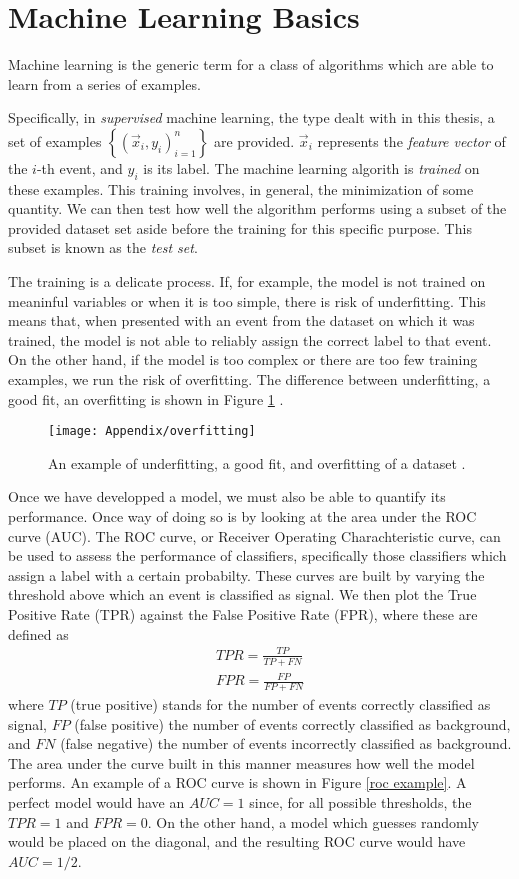 \documentclass[10pt,a4paper]{book}
\begin{document}
\section{Machine Learning Basics}

Machine learning is the generic term for a class of algorithms which are able to learn from a series of examples. 

Specifically, in \emph{supervised} machine learning, the type dealt with in this thesis, a set of examples $\left\lbrace (\vec{x}_i, y_i)_{i = 1}^n \right\rbrace$ are provided. $\vec{x}_i$ represents the \emph{feature vector} of the $i$-th event, and $y_i$ is its label. The machine learning algorith is \emph{trained} on these examples. This training involves, in general, the minimization of some quantity. We can then test how well the algorithm performs using a subset of the provided dataset set aside before the training for this specific purpose. This subset is known as the \emph{test set}.

The training is a delicate process. If, for example, the model is not trained on meaninful variables or when it is too simple, there is risk of underfitting. This means that, when presented with an event from the dataset on which it was trained, the model is not able to reliably assign the correct label to that event. On the other hand, if the model is too complex or there are too few training examples, we run the risk of overfitting. The difference between underfitting, a good fit, an overfitting is shown in Figure \ref{overfitting} . 

\begin{figure}
\centering
\texttt{[image: Appendix/overfitting]}
\caption{An example of underfitting, a good fit, and overfitting of a dataset \cite{burkov2019hundred}.}
\label{overfitting}
\end{figure}

Once we have developped a model, we must also be able to quantify its performance. Once way of doing so is by looking at the area under the ROC curve (AUC). The ROC curve, or Receiver Operating Charachteristic curve, can be used to assess the performance of classifiers, specifically those classifiers which assign a label with a certain probabilty. These curves are built by varying the threshold above which an event is classified as signal. We then plot the True Positive Rate (TPR) against the False Positive Rate (FPR), where these are defined as
\begin{gather}
TPR = \frac{TP}{TP + FN} \\
FPR = \frac{FP}{FP + FN}
\end{gather}
where $TP$ (true positive) stands for the number of events correctly classified as signal, $FP$ (false positive) the number of events correctly classified as background, and $FN$ (false negative) the number of events incorrectly classified as background. The area under the curve built in this manner measures how well the model performs. An example of a ROC curve is shown in Figure \ref{roc example}. A perfect model would have an $AUC = 1$ since, for all possible thresholds, the $TPR = 1$ and $FPR = 0$. On the other hand, a model which guesses randomly would be placed on the diagonal, and the resulting ROC curve would have $AUC = 1/2$.
\end{document}
